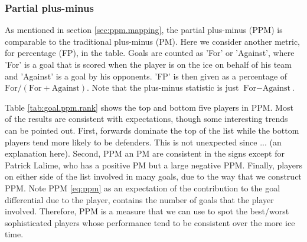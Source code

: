 \subsubsection{Partial plus-minus}
As mentioned in section \ref{sec:ppm.mapping}, the partial plus-minus (PPM) is comparable to the traditional plus-minus (PM). Here we consider another metric, for percentage (FP), in the table. Goals are counted as 'For' or 'Against', where 'For' is a goal that is scored when the player is on the ice on behalf of his team and 'Against' is a goal by his opponents. 'FP' is then given as a percentage of $\text{For}/(\text{For}+\text{Against})$. Note that the plus-minus statistic is just $\text{For}-\text{Against}$. 

Table \ref{tab:goal.ppm.rank} shows the top and bottom five players in PPM. Most of the results are consistent with expectations, though some interesting trends can be pointed out. First, forwards dominate the top of the list while the bottom players tend more likely to be defenders. This is not unexpected since ... (an explanation here). Second, PPM an PM are consistent in the signs except for Patrick Lalime, who has a positive PM but a large negative PPM. Finally, players on either side of the list involved in many goals, due to the way that we construct PPM. Note PPM \eqref{eq:ppm} as an expectation of the contribution to the goal differential due to the player, contains the number of goals that the player involved. Therefore, PPM is a measure that we can use to spot the best/worst sophisticated players whose performance tend to be consistent over the more ice time.  


